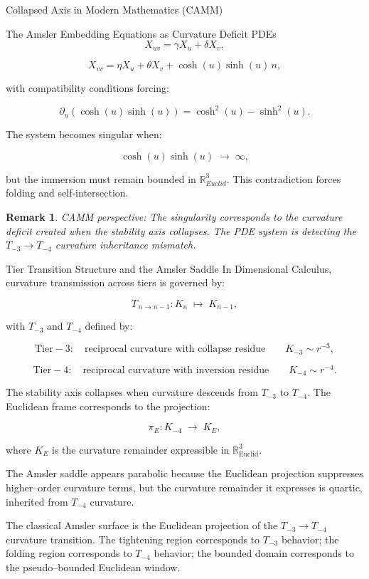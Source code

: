\documentclass[final,onefignum,onetabnum]{siamart}
\newtheorem{remark}{Remark}
\begin{document}
\begin{section}{Collapsed Axis in Modern Mathematics (CAMM)}
\begin{subsection}{The Amsler Embedding Equations as Curvature Deficit PDEs}
\[
X_{uv} = \gamma X_{u} + \delta X_{v},
\]


\[
X_{vv} = \eta X_{u} + \theta X_{v} + \cosh(u)\sinh(u)\, n,
\]


with compatibility conditions forcing:


\[
\partial_{u}\!\left(\cosh(u)\sinh(u)\right) = \cosh^{2}(u) - \sinh^{2}(u).
\]


The system becomes singular when:


\[
\cosh(u)\sinh(u) \;\to\; \infty,
\]


but the immersion must remain bounded in \(\mathbb{R}_{Euclid}^{3}\).  This contradiction forces folding and self‑intersection.

\begin{remark}
CAMM perspective: The singularity corresponds to the curvature deficit created when the stability axis collapses.  The PDE system is detecting the \(T_{-3} \to T_{-4}\) curvature inheritance mismatch.
\end{remark}
\end{subsection}

\begin{subsection}{Tier Transition Structure and the Amsler Saddle}
In Dimensional Calculus, curvature transmission across tiers is governed by:


\[
T_{\,n \to n-1} : K_{n} \;\mapsto\; K_{n-1},
\]


with $T_{-3}$ and $T_{-4}$ defined by:


\[
\text{Tier} -3:\quad \text{reciprocal curvature with collapse residue}
\qquad
K_{-3} \sim r^{-3},
\]


\[
\text{Tier} -4:\quad \text{reciprocal curvature with inversion residue}
\qquad
K_{-4} \sim r^{-4}.
\]


The stability axis collapses when curvature descends from $T_{-3}$ to $T_{-4}$. The Euclidean frame corresponds to the projection:


\[
\pi_{E} : K_{-4} \;\to\; K_{E},
\]


where $K_{E}$ is the curvature remainder expressible in \(\mathbb{R}_{\text{Euclid}}^{3}\).

The Amsler saddle appears parabolic because the Euclidean projection suppresses higher–order curvature terms, but the curvature remainder it expresses is quartic, inherited from $T_{-4}$ curvature.

\begin{theorem}
The classical Amsler surface is the Euclidean projection of the $T_{-3} \to T_{-4}$ curvature transition. The tightening region corresponds to $T_{-3}$ behavior; the folding region corresponds to $T_{-4}$ behavior; the bounded domain corresponds to the pseudo–bounded Euclidean window.
\end{theorem}


\end{subsection}
\end{section}
\end{document}
